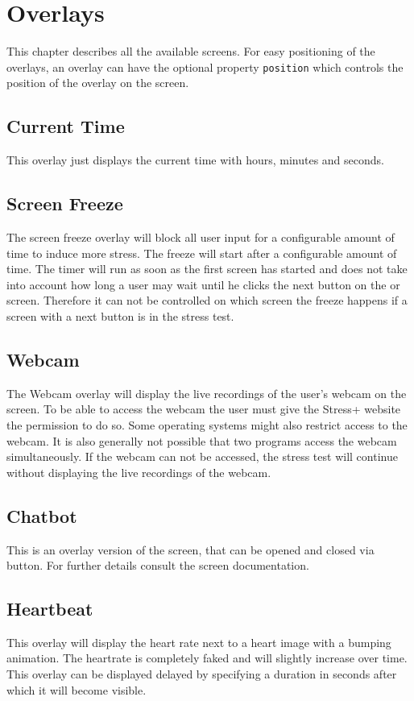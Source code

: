 \section{Overlays}
\label{sec:overlays}

This chapter describes all the available screens.
For easy positioning of the overlays, an overlay can have the optional property \texttt{position} which controls the position of the overlay on the screen.

\subsection{Current Time}
\label{sec:overlays-current-time}
This overlay just displays the current time with hours, minutes and seconds.

\subsection{Screen Freeze}
\label{sec:overlays-screen-freeze}
The screen freeze overlay will block all user input for a configurable amount of time to induce more stress.
The freeze will start after a configurable amount of time.
The timer will run as soon as the first screen has started and does not take into account how long a user may wait until he clicks the next button on the  or  screen.
Therefore it can not be controlled on which screen the freeze happens if a screen with a next button is in the stress test.

\subsection{Webcam}
\label{sec:overlays-webcam}
The Webcam overlay will display the live recordings of the user's webcam on the screen.
To be able to access the webcam the user must give the Stress+ website the permission to do so.
Some operating systems might also restrict access to the webcam.
It is also generally not possible that two programs access the webcam simultaneously.
If the webcam can not be accessed, the stress test will continue without displaying the live recordings of the webcam.

\subsection{Chatbot}
\label{sec:overlays-chatbot}
This is an overlay version of the  screen, that can be opened and closed via button.
For further details consult the  screen documentation.


\subsection{Heartbeat}
\label{sec:overlays-heartbeat}
This overlay will display the heart rate next to a heart image with a bumping animation.
The heartrate is completely faked and will slightly increase over time.
This overlay can be displayed delayed by specifying a duration in seconds after which it will become visible.
